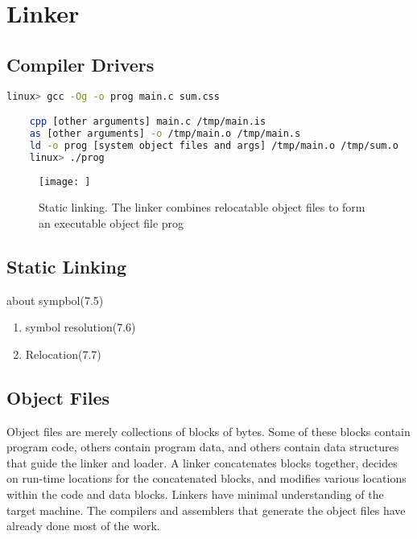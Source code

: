 \chapter{Linker}

\section{Compiler Drivers}



\begin{lstlisting}[language=bash]
    linux> gcc -Og -o prog main.c sum.css

    cpp [other arguments] main.c /tmp/main.is
    as [other arguments] -o /tmp/main.o /tmp/main.s
    ld -o prog [system object files and args] /tmp/main.o /tmp/sum.o
    linux> ./prog
\end{lstlisting}

\begin{figure}[h!]
    \centering
    \texttt{[image: ]}
    \caption{Static linking. The linker combines relocatable    object files to form an executable object file prog}
\end{figure}



\section{Static Linking}

about sympbol(7.5)
\begin{enumerate}
    \item symbol resolution(7.6)
    \item Relocation(7.7)
\end{enumerate}

\section{Object Files}

Object files are merely collections of blocks
of bytes. Some of these blocks contain program code, others contain program
data, and others contain data structures that guide the linker and loader. A linker
concatenates blocks together, decides on run-time locations for the concatenated
blocks, and modifies various locations within the code and data blocks. Linkers
have minimal understanding of the target machine. The compilers and assemblers
that generate the object files have already done most of the work.


